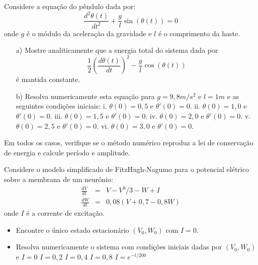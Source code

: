 \begin{exer} Considere a equação do pêndulo dada por:
\begin{equation} \frac{d^2\theta(t)}{dt^2}+\frac{g}{l}\sin(\theta(t))=0 \end{equation}
onde $g$ é o módulo da aceleração da gravidade e $l$ é o comprimento da haste.
\begin{itemize}
\item[a)] Mostre analiticamente que a energia total do sistema dada por
\begin{equation} \frac{1}{2}\left(\frac{d\theta(t)}{dt}\right)^2-\frac{g}{l}\cos(\theta(t)) \end{equation}
é mantida constante.
\item[b)] Resolva numericamente esta equação para $g=9,8m/s^2$ e $l=1m$ e as seguintes condições iniciais:
\subitem i. $\theta(0)=0,5$ e $\theta'(0)=0$.
\subitem ii. $\theta(0)=1,0$ e $\theta'(0)=0$.
\subitem iii. $\theta(0)=1,5$ e $\theta'(0)=0$.
\subitem iv. $\theta(0)=2,0$ e $\theta'(0)=0$.
\subitem v. $\theta(0)=2,5$ e $\theta'(0)=0$.
\subitem vi. $\theta(0)=3,0$ e $\theta'(0)=0$.
\end{itemize}
Em todos os casos, verifique se o método numérico reproduz a lei de conservação de energia e calcule período e amplitude.
\end{exer}

\begin{exer} Considere o modelo simplificado de FitzHugh-Nagumo para o potencial elétrico sobre a membrana de um neurônio:
\begin{eqnarray}
\frac{d V}{dt}& = &  V-V^3/3 - W +  I  \\
\frac{d W}{dt} & = & 0,08(V+0,7 - 0,8W)
\end{eqnarray}
onde $I$ é a corrente de excitação.
\begin{itemize}
\item Encontre o único estado estacionário $\left(V_0,W_0\right)$ com $I=0$.
\item Resolva numericamente o sistema com condições iniciais dadas por $\left(V_0,W_0\right)$ e
\subitem $I=0$
\subitem $I=0,2$
\subitem $I=0,4$
\subitem $I=0,8$
\subitem $I=e^{-t/200}$
\end{itemize}
\end{exer}



%
